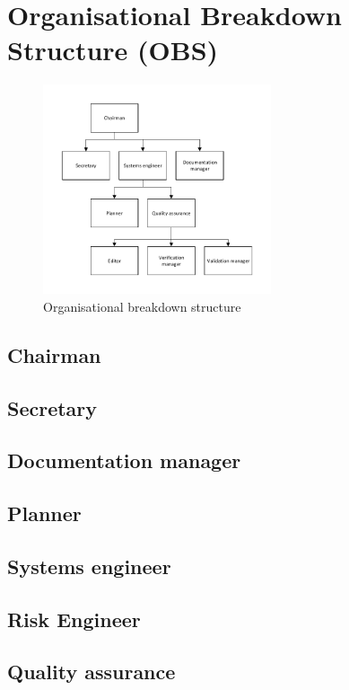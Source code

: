 \section{Organisational Breakdown Structure (OBS)}\label{cha:OBS}
\begin{figure}[h]
\centering
\includegraphics[width=0.6\textwidth]{./Figure/OBS.pdf}
\caption{Organisational breakdown structure}
\end{figure}

\subsection{Chairman}\label{par:Chairman}


\subsection{Secretary}\label{par:Secretary}


\subsection{Documentation manager}\label{par:D_and_A}


\subsection{Planner}\label{par:Planner}


\subsection{Systems engineer}\label{par:SE}


\subsection{Risk Engineer}\label{par:RiskEng}


\subsection{Quality assurance}\label{par:QA}

